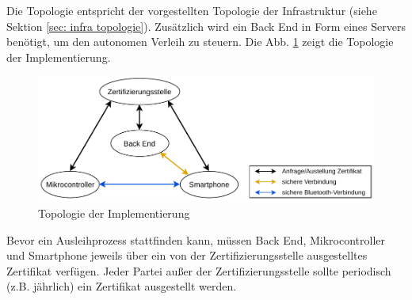 Die Topologie entspricht der vorgestellten Topologie der Infrastruktur (siehe Sektion \ref{sec: infra topologie}). Zusätzlich wird ein Back End in Form eines Servers benötigt, um den autonomen Verleih zu steuern. Die Abb. \ref{fig: impl topo} zeigt die Topologie der Implementierung.
\begin{figure}[H]
    \centering
    \includegraphics[width=1\textwidth]{graphics/impl_topologie.pdf}
    \caption[Topologie der Implementierung]{Topologie der Implementierung}
    \label{fig: impl topo}
\end{figure}
Bevor ein Ausleihprozess stattfinden kann, müssen Back End, Mikrocontroller und Smartphone jeweils über ein von der Zertifizierungsstelle ausgestelltes Zertifikat verfügen. Jeder Partei außer der Zertifizierungsstelle sollte periodisch (z.B. jährlich) ein Zertifikat ausgestellt werden.